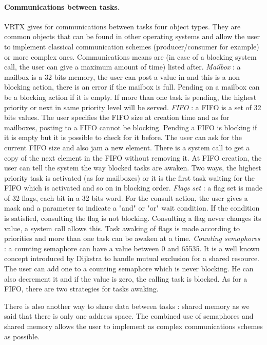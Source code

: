 \documentclass[10pt]{report}
\begin{document}
\paragraph{Communications between tasks.} VRTX gives for communications between tasks four object types. They are common
objects that can be found in other operating systems and allow the user to implement classical communication schemes
(producer/consumer for example) or more complex ones. Communications means are (in case of a blocking system call, the user
can give a maximum amount of time) listed after. {\em Mailbox} : a mailbox is a 32 bits memory, the user can post a value in
and this is a non blocking action, there is an error if the mailbox is full. Pending on a mailbox can be a blocking action if
it is empty. If more than one task is pending, the highest priority or next in same priority level will be served. {\em FIFO} :
a FIFO is a set of 32 bits values. The user specifies the FIFO size at creation time and as for mailboxes, posting to a FIFO
cannot be blocking. Pending a FIFO is blocking if it is empty but it is possible to check for it before. The user can ask for
the current FIFO size and also jam a new element. There is a system call to get a copy of the next element in the FIFO without
removing it. At FIFO creation, the user can tell the system the way blocked tasks are awaken. Two ways, the highest priority
task is activated (as for mailboxes) or it is the first task waiting for the FIFO which is activated and so on in blocking
order. {\em Flags set} : a flag set is made of 32 flags, each bit in a 32 bits word. For the consult action, the user gives
a mask and a parameter to indicate a "and" or "or" wait condition. If the condition is satisfied, consulting the flag is not
blocking. Consulting a flag never changes its value, a system call allows this. Task awaking of flags is made according to
priorities and more than one task can be awaken at a time. {\em Counting semaphores} : a counting semaphore can have a value
between 0 and 65535. It is a well known concept introduced by Dijkstra to handle mutual exclusion for a shared resource.
The user can add one to a counting semaphore which is never blocking. He can also decrement it and if the value is zero, the
calling task is blocked. As for a FIFO, there are two strategies for tasks awaking.

There is also another way to share data between tasks : shared memory as we said that there is only one address space. The
combined use of semaphores and shared memory allows the user to implement as complex communications schemes as possible.
\end{document}
